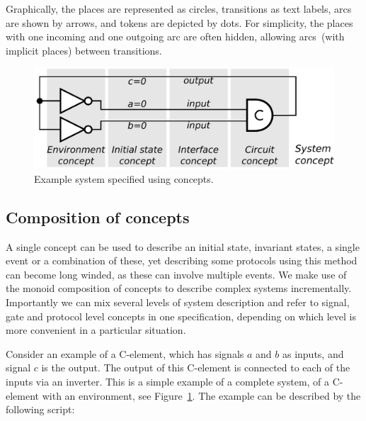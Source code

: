 \documentclass[british, journal]{IEEEtran}
\begin{document}
Graphically, the places are represented as circles, transitions as
text labels, arcs are shown by arrows, and tokens are depicted by dots.
For simplicity, the places with one incoming
and one outgoing arc are often hidden, allowing arcs~(with implicit
places) between transitions.

\begin{figure}[t]
\begin{centering}
\includegraphics[scale=0.51]{Images/C-element-with-environment}
\par\end{centering}
\protect\caption{\label{fig:cElement-concepts}Example system specified using concepts.}
\vspace{-3mm}
\end{figure}

\vspace{-1mm}
\subsection{Composition of concepts\label{sub:Comp-of-concepts}}

A single concept can be used to describe an initial state, invariant
states, a single event or a combination of these, yet describing some
protocols using this method can become long winded, as these can involve
multiple events. We make use of the monoid composition of concepts
to describe complex systems incrementally. Importantly we can mix
several levels of system description and refer to signal, gate and
protocol level concepts in one specification, depending on which level
is more convenient in a particular situation.

Consider an example of a C-element, which has signals $a$ and $b$ as inputs,
and signal $c$ is the output. The output of this C-element is connected to
each of the inputs via an inverter. This is a simple example of a complete
system, of a C-element with an environment, see Figure~\ref{fig:cElement-concepts}.
The example can be described by the following script:
\end{document}
